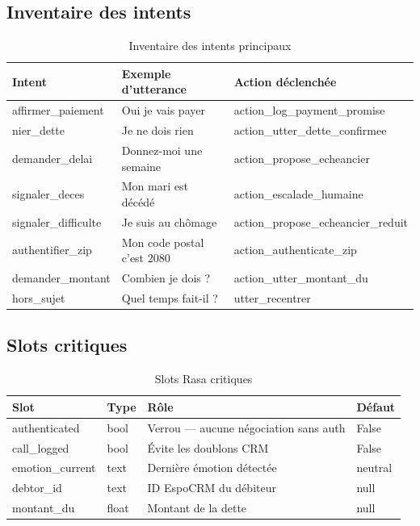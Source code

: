 \subsection{Inventaire des intents}

\begin{table}[H]
  \centering
  \caption{Inventaire des intents principaux}
  \label{tab:intents}
  \begin{tabularx}{\textwidth}{llX}
    \toprule
    \textbf{Intent} & \textbf{Exemple d'utterance} & \textbf{Action déclenchée} \\
    \midrule
    affirmer\_paiement   & \og{}Oui je vais payer\fg{}         & action\_log\_payment\_promise \\
    nier\_dette          & \og{}Je ne dois rien\fg{}            & action\_utter\_dette\_confirmee \\
    demander\_delai      & \og{}Donnez-moi une semaine\fg{}     & action\_propose\_echeancier \\
    signaler\_deces      & \og{}Mon mari est décédé\fg{}        & action\_escalade\_humaine \\
    signaler\_difficulte & \og{}Je suis au chômage\fg{}         & action\_propose\_echeancier\_reduit \\
    authentifier\_zip    & \og{}Mon code postal c'est 2080\fg{} & action\_authenticate\_zip \\
    demander\_montant    & \og{}Combien je dois ?\fg{}          & action\_utter\_montant\_du \\
    hors\_sujet          & \og{}Quel temps fait-il ?\fg{}       & utter\_recentrer \\
    \bottomrule
  \end{tabularx}
\end{table}

\subsection{Slots critiques}

\begin{table}[H]
  \centering
  \caption{Slots Rasa critiques}
  \label{tab:slots}
  \begin{tabularx}{\textwidth}{llXl}
    \toprule
    \textbf{Slot} & \textbf{Type} & \textbf{Rôle} & \textbf{Défaut} \\
    \midrule
    authenticated    & bool  & Verrou — aucune négociation sans auth & False \\
    call\_logged     & bool  & Évite les doublons CRM                & False \\
    emotion\_current & text  & Dernière émotion détectée             & neutral \\
    debtor\_id       & text  & ID EspoCRM du débiteur                & null \\
    montant\_du      & float & Montant de la dette                   & null \\
    \bottomrule
  \end{tabularx}
\end{table}

